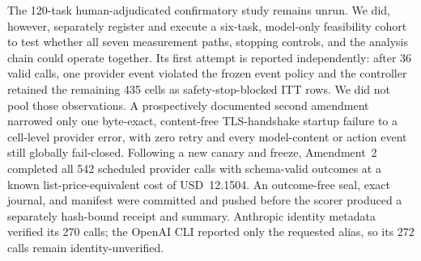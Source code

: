 \documentclass[11pt,letterpaper]{article}
\begin{document}
The 120-task human-adjudicated confirmatory study remains unrun. We did, however, separately register and execute a six-task, model-only feasibility cohort to test whether all seven measurement paths, stopping controls, and the analysis chain could operate together. Its first attempt is reported independently: after 36 valid calls, one provider event violated the frozen event policy and the controller retained the remaining 435 cells as safety-stop-blocked ITT rows. We did not pool those observations. A prospectively documented second amendment narrowed only one byte-exact, content-free TLS-handshake startup failure to a cell-level provider error, with zero retry and every model-content or action event still globally fail-closed. Following a new canary and freeze, Amendment~2 completed all 542 scheduled provider calls with schema-valid outcomes at a known list-price-equivalent cost of USD~12.1504. An outcome-free seal, exact journal, and manifest were committed and pushed before the scorer produced a separately hash-bound receipt and summary. Anthropic identity metadata verified its 270 calls; the OpenAI CLI reported only the requested alias, so its 272 calls remain identity-unverified.
\end{document}
